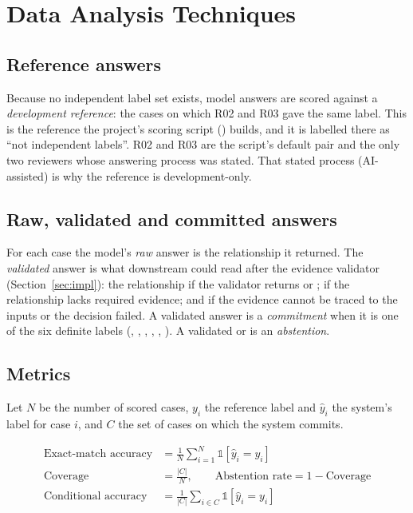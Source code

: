 \section{Data Analysis Techniques}
\label{sec:analysis}

\subsection{Reference answers}

Because no independent label set exists, model answers are scored against a \emph{development reference}: the cases on which R02 and R03 gave the same label. This is the reference the project's scoring script () builds, and it is labelled there as ``not independent labels''. R02 and R03 are the script's default pair and the only two reviewers whose answering process was stated. That stated process (AI-assisted) is why the reference is development-only.

\subsection{Raw, validated and committed answers}

For each case the model's \emph{raw} answer is the relationship it returned. The \emph{validated} answer is what downstream could read after the evidence validator (Section~\ref{sec:impl}): the relationship if the validator returns  or ; \IE{} if the relationship lacks required evidence; and \AM{} if the evidence cannot be traced to the inputs or the decision failed. A validated answer is a \emph{commitment} when it is one of the six definite labels (\SC, \PA, \CH, \RE, \PO, \UN). A validated \AM{} or \IE{} is an \emph{abstention}.

\subsection{Metrics}

Let $N$ be the number of scored cases, $y_i$ the reference label and $\hat{y}_i$ the system's label for case $i$, and $C$ the set of cases on which the system commits.

\begin{align}
\text{Exact-match accuracy} &= \frac{1}{N}\sum_{i=1}^{N} \mathbb{1}[\hat{y}_i = y_i] \label{eq:acc}\\
\text{Coverage} &= \frac{|C|}{N}, \qquad \text{Abstention rate} = 1 - \text{Coverage} \label{eq:cov}\\
\text{Conditional accuracy} &= \frac{1}{|C|}\sum_{i \in C} \mathbb{1}[\hat{y}_i = y_i] \label{eq:condacc}
\end{align}

